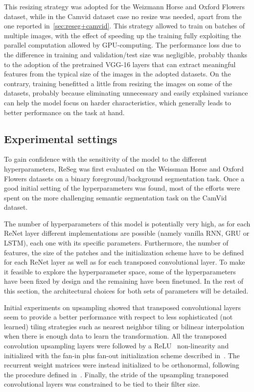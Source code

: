 This resizing strategy was adopted for the Weizmann Horse and Oxford Flowers
dataset, while in the Camvid dataset case no resize was needed, apart from the
one reported in~\autoref{sec:reseg+camvid}. This strategy allowed to train on
batches of multiple images, with the effect of speeding up the training fully
exploiting the parallel computation allowed by GPU-computing. The performance
loss due to the difference in training and validation/test size was negligible,
probably thanks to the adoption of the pretrained VGG-16 layers that can
extract meaningful features from the typical size of the images in the adopted
datasets. On the contrary, training benefitted a little from resizing the
images on some of the datasets, probably because eliminating unnecessary and
easily explained variance can help the model focus on harder characteristics,
which generally leads to better performance on the task at hand.

\subsection{Experimental settings}

To gain confidence with the sensitivity of the model to the different
hyperparameters, ReSeg was first evaluated on the Weissman Horse and Oxford
Flowers datasets on a binary foreground/background segmentation task. Once a
good initial setting of the hyperparameters was found, most of the efforts were
spent on the more challenging semantic segmentation task on the CamVid dataset.

The number of hyperparameters of this model is potentially very high, as for
each ReNet layer different implementations are possible (namely vanilla RNN,
GRU or LSTM), each one with its specific parameters. Furthermore, the number of
features, the size of the patches and the initialization scheme have to be
defined for each ReNet layer as well as for each transposed convolutional
layer. To make it feasible to explore the hyperparameter space, some of the
hyperparameters have been fixed by design and the remaining have been
finetuned.
In the rest of this section, the architectural choices for both
sets of parameters will be detailed.

Initial experiments on upsampling showed that transposed convolutional layers
seem to provide a better performance with respect to less sophisticated (not
learned) tiling strategies such as nearest neighbor tiling or bilinear
interpolation when there is enough data to learn the transformation. All the
transposed convolution upsampling layers were followed by a
ReLU~\citep{Krizhevsky2012-alexnet} non-linearity and initialized with the
fan-in plus fan-out initialization scheme described
in~\citep{glorot2010understanding}. The recurrent weight matrices were instead
initialized to be orthonormal, following the procedure defined
in~\citep{Saxe2014}. Finally, the stride of the upsampling transposed
convolutional layers was constrained to be tied to their filter size.

